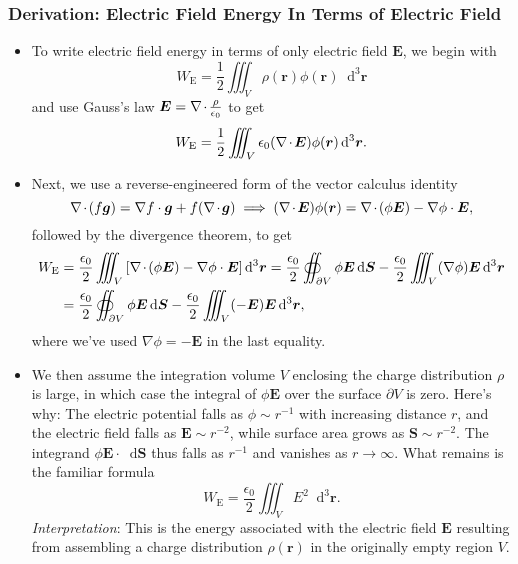 \documentclass[11pt, a4paper]{article}
\newcommand{\diff}{\mathop{}\!\mathrm{d}} %
\newcommand{\dr}{\diff^{3} \r}  %
\renewcommand{\vec}[1]{\bm{#1}} %
\renewcommand{\r}{\vec{r}}
\newcommand{\E}{\vec{E}} %
\newcommand{\ee}{\epsilon_{0}}  %
\renewcommand{\div}{\nabla \mspace{-2mu} \cdot \mspace{-2mu}}
\renewcommand{\grad}{\nabla}
\begin{document}
\subsubsection{Derivation: Electric Field Energy In Terms of Electric Field}
\begin{itemize}
	\item To write electric field energy in terms of only electric field $ \E $, we begin with
	\begin{equation*}
		W_{\text{E}} = \frac{1}{2} \iiint_{V} \rho(\r) \phi(\r) \dr
	\end{equation*}
	and use Gauss's law $ \E = \div \frac{\rho}{\ee} $ to get
	\begin{equation*}
		W_{\text{E}}  = \frac{1}{2} \iiint_{V} \ee (\div \E) \phi(\r) \dr.
	\end{equation*}
	
    \item Next, we use a reverse-engineered form of the vector calculus identity 
	\begin{equation*}
		\div (f \vec{g}) = \grad f \cdot \vec{g} + f (\div \vec{g}) \implies (\div \E) \phi(\r) = \div (\phi \E) - \grad \phi \cdot \E,
	\end{equation*}
	followed by the divergence theorem, to get
	\begin{align*}
		W_{\text{E}} &= \frac{\ee}{2} \iiint_{V}\left[\div (\phi \E) - \grad \phi \cdot \E\right] \dr = \frac{\ee}{2} \oiint_{\partial V} \phi \E \diff \vec{S} - \frac{\ee}{2} \iiint_{V} (\grad \phi) \E \dr\\
		& =  \frac{\ee}{2} \oiint_{\partial V} \phi \E \diff \vec{S} - \frac{\ee}{2} \iiint_{V} (- \E) \E \dr,
	\end{align*}
	where we've used $ \grad \phi = - \E $ in the last equality. 
	
	\item We then assume the integration volume $ V $ enclosing the charge distribution $ \rho $ is large, in which case the integral of $ \phi \E $ over the surface $ \partial V $ is zero. Here's why: The electric potential falls as $ \phi \sim r^{-1} $ with increasing distance $ r $, and the electric field falls as $ \E \sim r^{-2} $, while surface area grows as $ \vec{S} \sim r^{-2} $. The integrand  $ \phi \E \cdot \diff \vec{S} $ thus falls as $ r^{-1} $ and vanishes as $ r \to \infty $. What remains is the familiar formula
	\begin{equation*}
		W_{\text{E}} = \frac{\ee}{2} \iiint_{V} E^{2} \dr.
	\end{equation*} 
	\textit{Interpretation}: This is the energy associated with the electric field $ \E $ resulting from assembling a charge distribution $ \rho(\r) $ in the originally empty region $ V $.

\end{itemize}
\end{document}
